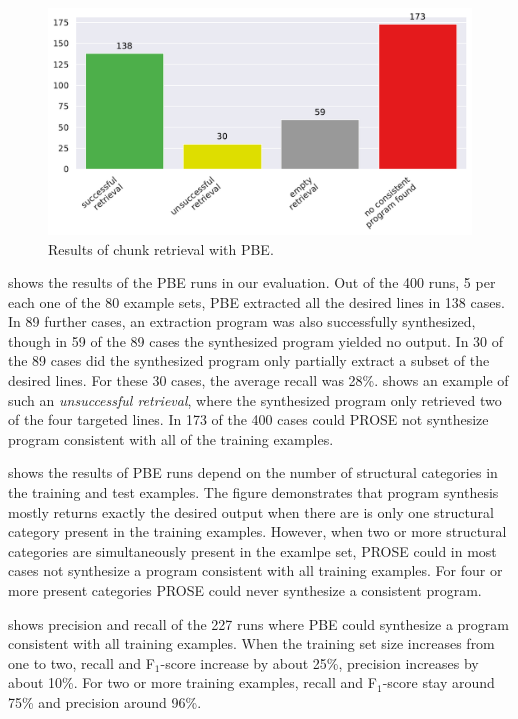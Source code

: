 \begin{figure}[tbp]
		\centering
		\includegraphics[width=0.75\columnwidth,
		clip]{img/big-study/failure-reason-pbe.pdf}
		\caption{Results of chunk retrieval with PBE.}
		\label{fig:failure-reason-PBE}
\end{figure}

 shows the results of the PBE runs in our
evaluation.
Out of the 400 runs, 5 per each one of the 80 example
sets, PBE extracted all the desired lines in 138 cases.
In 89 further
cases, an extraction program was also successfully synthesized, though
in 59 of the 89 cases the synthesized program yielded no output.
In 30
of the 89 cases did the synthesized program only partially extract a
subset of the desired lines.
For these 30 cases, the average recall
was 28\%.
 shows an example of such
an \emph{unsuccessful retrieval}, where the synthesized program only
retrieved two of the four targeted lines.
In 173 of the 400 cases
could PROSE not synthesize program consistent with all of the training
examples.

 shows the results of PBE
runs depend on the number of structural categories in the training and
test examples.
The figure demonstrates that program synthesis mostly
returns exactly the desired output when there are is only one
structural category present in the training examples.
However, when
two or more structural categories are simultaneously present in the
examlpe set, PROSE could in most cases not synthesize a program
consistent with all training examples.
For four or more present
categories PROSE could never synthesize a consistent program.

 shows
precision and recall of the 227 runs where PBE could synthesize a
program consistent with all training examples.
When the training set
size increases from one to two, recall and F$_{1}$-score increase by
about 25\%, precision increases by about 10\%.
For two or more
training examples, recall and F$_{1}$-score stay around 75\% and
precision around 96\%.

